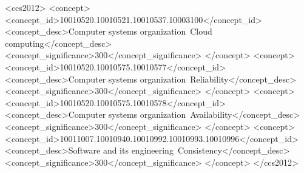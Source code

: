 \author{Vasilis Gavrielatos, Antonios Katsarakis, Vijay Nagarajan}




%
\begin{CCSXML}
<ccs2012>
<concept>
<concept_id>10010520.10010521.10010537.10003100</concept_id>
<concept_desc>Computer systems organization~Cloud computing</concept_desc>
<concept_significance>300</concept_significance>
</concept>
<concept>
<concept_id>10010520.10010575.10010577</concept_id>
<concept_desc>Computer systems organization~Reliability</concept_desc>
<concept_significance>300</concept_significance>
</concept>
<concept>
<concept_id>10010520.10010575.10010578</concept_id>
<concept_desc>Computer systems organization~Availability</concept_desc>
<concept_significance>300</concept_significance>
</concept>
<concept>
<concept_id>10011007.10010940.10010992.10010993.10010996</concept_id>
<concept_desc>Software and its engineering~Consistency</concept_desc>
<concept_significance>300</concept_significance>
</concept>
</ccs2012>
\end{CCSXML}


%
